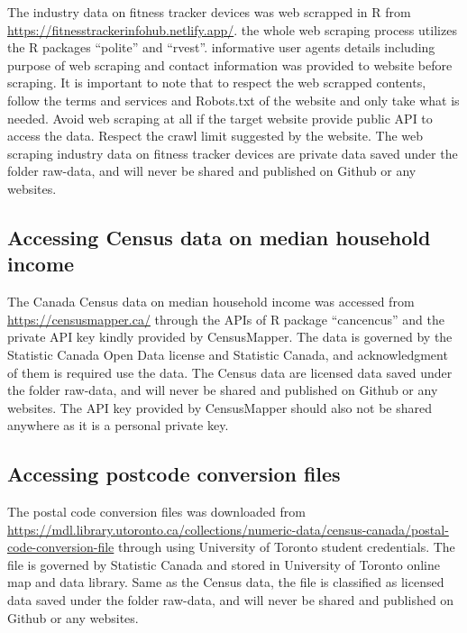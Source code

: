 \documentclass[
          english,
          paper=a4,
              ,captions=tableheading
  ]{scrartcl}
\begin{document}
The industry data on fitness tracker devices was web scrapped in R from
\url{https://fitnesstrackerinfohub.netlify.app/}. the whole web scraping
process utilizes the R packages ``polite'' and ``rvest''. informative
user agents details including purpose of web scraping and contact
information was provided to website before scraping. It is important to
note that to respect the web scrapped contents, follow the terms and
services and Robots.txt of the website and only take what is needed.
Avoid web scraping at all if the target website provide public API to
access the data. Respect the crawl limit suggested by the website. The
web scraping industry data on fitness tracker devices are private data
saved under the folder raw-data, and will never be shared and published
on Github or any websites.

\hypertarget{accessing-census-data-on-median-household-income}{%
\subsection{Accessing Census data on median household
income}\label{accessing-census-data-on-median-household-income}}

The Canada Census data on median household income was accessed from
\url{https://censusmapper.ca/} through the APIs of R package
``cancencus'' and the private API key kindly provided by CensusMapper.
The data is governed by the Statistic Canada Open Data license and
Statistic Canada, and acknowledgment of them is required use the data.
The Census data are licensed data saved under the folder raw-data, and
will never be shared and published on Github or any websites. The API
key provided by CensusMapper should also not be shared anywhere as it is
a personal private key.

\hypertarget{accessing-postcode-conversion-files}{%
\subsection{Accessing postcode conversion
files}\label{accessing-postcode-conversion-files}}

The postal code conversion files was downloaded from
\url{https://mdl.library.utoronto.ca/collections/numeric-data/census-canada/postal-code-conversion-file}
through using University of Toronto student credentials. The file is
governed by Statistic Canada and stored in University of Toronto online
map and data library. Same as the Census data, the file is classified as
licensed data saved under the folder raw-data, and will never be shared
and published on Github or any websites.
\end{document}
